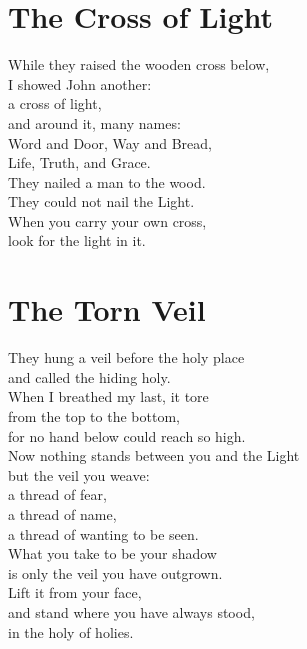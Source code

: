 \documentclass[10pt, openright]{book}
\newcommand{\sectionbreak}{\filbreak}
\newcommand{\sayingsource}[1]{\par\nopagebreak\vspace{0.3\baselineskip}{\raggedleft\footnotesize\itshape #1\par}}
\begin{document}
\sayingsource{Acts of John 94--96}

\sectionbreak

\section{The Cross of Light}\label{the-cross-of-light}

While they raised the wooden cross below,\\
I showed John another:\\
a cross of light,\\
and around it, many names:\\
Word and Door, Way and Bread,\\
Life, Truth, and Grace.\\
They nailed a man to the wood.\\
They could not nail the Light.\\
When you carry your own cross,\\
look for the light in it.

\sayingsource{Acts of John 97--101}

\sectionbreak

\section{The Torn Veil}\label{the-torn-veil}

They hung a veil before the holy place\\
and called the hiding holy.\\
When I breathed my last, it tore\\
from the top to the bottom,\\
for no hand below could reach so high.\\
Now nothing stands between you and the Light\\
but the veil you weave:\\
a thread of fear,\\
a thread of name,\\
a thread of wanting to be seen.\\
What you take to be your shadow\\
is only the veil you have outgrown.\\
Lift it from your face,\\
and stand where you have always stood,\\
in the holy of holies.

\sayingsource{Philip}
\end{document}
